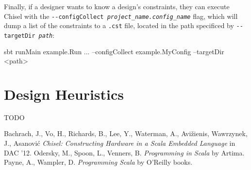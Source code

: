 \documentclass[10pt,twocolumn]{article}
\def\code#1{{\small\tt #1}}
\begin{document}
Finally, if a designer wants to know a design's constraints, they can execute Chisel with the \code{-{-}configCollect {\it project\_name.config\_name}} flag, which will dump a list of the constraints to a \code{*.cst} file, located in the path specificed by \code{-{-}targetDir {\it path}}:

\begin{scala}
sbt runMain example.Run ... --configCollect example.MyConfig --targetDir <path>
\end{scala}

\section{Design Heuristics}
\label{sec:heuristics}

TODO


% 
\begin{thebibliography}{50}
 Bachrach, J., Vo, H., Richards, B., Lee, Y., Waterman,
  A., Avi\v{z}ienis, Wawrzynek, J., Asanovi\'{c} \textsl{Chisel:
    Constructing Hardware in a Scala Embedded Language}
in DAC '12.
Odersky, M., Spoon, L., Venners,
  B. \textsl{Programming in Scala} by Artima.
Payne, A., Wampler, D.
  \textsl{Programming Scala} by O'Reilly books.
\end{thebibliography}
 
\end{document}
